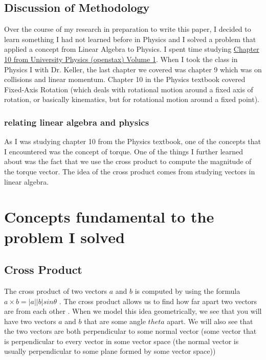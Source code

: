 \documentclass{turabian-researchpaper}
\begin{document}
\subsection{Discussion of Methodology} 

Over the course of my research in preparation to write this paper, I decided to learn something I had not learned before in Physics and I solved a problem that applied a concept from Linear Algebra to Physics. I spent time studying \href{https://openstax.org/books/university-physics-volume-1/pages/10-introduction}{Chapter 10 from University Physics (openstax) Volume 1}. When I took the class in Physics I with Dr. Keller, the last chapter we covered was chapter 9 which was on collisions and linear momentum. Chapter 10 in the Physics textbook covered Fixed-Axis Rotation (which deals with rotational motion around a fixed axis of rotation, or basically kinematics, but for rotational motion around a fixed point).  

\subsubsection{relating linear algebra and physics} 

As I was studying chapter 10 from the Physics textbook, one of the concepts that I encountered was the concept of torque. One of the things I further learned about was the fact that we use the cross product to compute the magnitude of the torque vector. The idea of the cross product comes from studying vectors in linear algebra. 

\section{Concepts fundamental to the problem I solved} 

\subsection{Cross Product} 

The cross product of two vectors \(a\) and \(b\) is computed by using the formula \(a \times b = \lvert a \rvert \lvert b \rvert sin{\theta}\) \cite{CrossProductsUdemyNOTESKristaKingMath2024}. The cross product allows us to find how far apart two vectors are from each other \cite{DotandCrossProductsasOppositeIdeasUdemyNOTESKristaKingMath2024}. When we model this idea geometrically,   we see that you will have two vectors \(a\) and \(b\) that are some angle \(theta\) apart. We will also see that the two vectors are both perpendicular to some normal vector (some vector that is perpendicular to every vector in some vector space (the normal vector is usually perpendicular to some plane formed by some vector space))  
\end{document}
